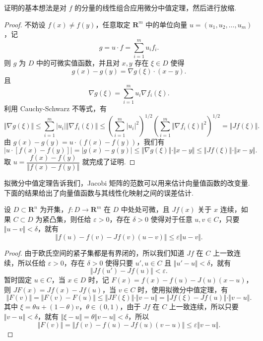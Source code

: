 证明的基本想法是对 $f$ 的分量的线性组合应用微分中值定理，然后进行放缩.

\begin{proof}
    不妨设 $f(x) \neq f(y)$，任意取定 $\mathbf{R}^m$ 中的单位向量 $u = (u_1, u_2, \ldots, u_m)$，记\[g = u\cdot f = \sum_{i = 1}^{m}u_if_i.\]
    则 $g$ 为 $D$ 中的可微实值函数，并且对 $x, y$ 存在 $\xi\in D$ 使得 \[g(x) - g(y) = \nabla g(\xi)\cdot (x - y).\]
    且 \[\nabla g(\xi) = \sum_{i = 1}^{m}u_i\nabla f_i(\xi).\]
    利用 Cauchy-Schwarz 不等式，有 \[\Vert \nabla g(\xi)\Vert \leqslant \sum_{i = 1}^m\vert u_i\vert \Vert \nabla f_i(\xi)\Vert \leqslant \left(\sum_{i = 1}^m\vert u_i\vert^2\right)^{1/2}\left(\sum_{i = 1}^m\Vert \nabla f_i(\xi)\Vert^2\right)^{1/2} = \Vert Jf(\xi)\Vert.\]
    由 $g(x) - g(y) = u\cdot (f(x) - f(y))$，我们有 \[\vert u \cdot [f(x) - f(y)]\vert = \vert g(x) - g(y) \vert \leqslant \Vert \nabla g(\xi)\Vert \cdot \Vert x - y\Vert \leqslant \Vert Jf(\xi)\Vert\cdot \Vert x - y\Vert.\]
    取 $u = \dfrac{f(x) - f(y)}{\Vert f(x) - f(y)\Vert}$ 就完成了证明.
\end{proof}

拟微分中值定理告诉我们，Jacobi 矩阵的范数可以用来估计向量值函数的改变量. 下面的结果给出了向量值函数与其线性化映射之间的误差估计.

\begin{corollary}{}{}
    设 $D\subset \mathbf{R}^n$ 为开集，$f\colon D\to \mathbf{R}^m$ 在 $D$ 中处处可微，且 $Jf(x)$ 关于 $x$ 连续，如果 $C\subset D$ 为紧凸集，则任给 $\varepsilon>0$，存在 $\delta>0$ 使得对于任意 $u, v\in C$，只要 $\Vert u-v\Vert < \delta$，就有\[\Vert f(u) - f(v) - Jf(v)(u-v)\Vert \leqslant \varepsilon\Vert u-v\Vert.\]
\end{corollary}

\begin{proof}
    由于欧氏空间的紧子集都是有界闭的，所以我们知道 $Jf$ 在 $C$ 上一致连续，所以任给 $\varepsilon>0$，存在 $\delta>0$ 使得只要 $u',u\in C$ 且 $\Vert u'-u\Vert < \delta$，就有\[\Vert Jf(u') - Jf(u)\Vert < \varepsilon.\]
    暂时固定 $u\in C$，当 $x\in D$ 时，记 $F(x) = f(x) - f(u) - J(u)(x - u)$，则 $JF(x) = Jf(x) - Jf(u)$，当 $v\in C$ 时，使用拟微分中值定理，有
    \[\Vert F(v)\Vert = \Vert F(v) - F(u)\Vert \leqslant \Vert JF(\xi)\Vert\cdot \Vert v - u\Vert = \Vert Jf(\xi) - Jf(u)\Vert\cdot \Vert v - u\Vert.\]
    其中 $\xi = \theta u + (1-\theta)v$，$\theta\in (0, 1)$，由于 $Jf$ 在 $C$ 上一致连续，所以只要 $\Vert v - u\Vert < \delta$，就有 $\Vert \xi - u\Vert = \theta \Vert v - u\Vert < \delta$，所以\[\Vert F(v)\Vert = \Vert f(v) - f(u) - Jf(u)(v - u)\Vert \leqslant \varepsilon\Vert v - u\Vert.\]
\end{proof}


